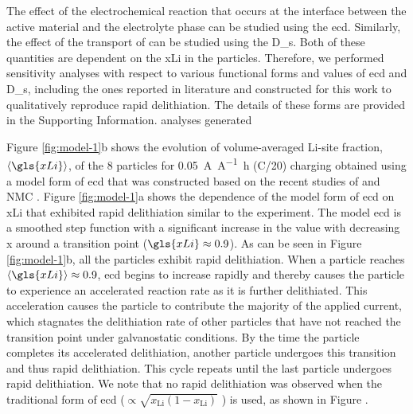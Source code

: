 \documentclass{article}
\begin{document}
The effect of the electrochemical reaction that occurs at the
interface between the active material and the electrolyte phase can be
studied using the \gls{ecd}. Similarly, the effect of the transport of
 can be studied using the \gls{D_s}. Both of these quantities
are dependent on the \gls{xLi} in the particles. Therefore, we
performed sensitivity analyses with respect to various functional
forms and values of \gls{ecd} and \gls{D_s}, including the ones
reported in literature and constructed for this work to
qualitatively reproduce rapid delithiation. The details of these forms
are provided in the Supporting Information. %
analyses generated

Figure \ref{fig:model-1}b shows the evolution of volume-averaged
Li-site fraction, $\left\langle \gls{xLi} \right\rangle$, of the 8
particles for \SI{0.05}{\ampere\per\ampere\hour} (C/20) charging
obtained using a model form of \gls{ecd} that was constructed based on
the recent studies of \nca{} \cite{chueh2021} and NMC \cite{tsai2018,
  mukherjee2017, chiang2020}. Figure \ref{fig:model-1}a shows the
dependence of the model form of \gls{ecd} on \gls{xLi} that exhibited
rapid delithiation similar to the experiment. The model \gls{ecd} is a
smoothed step function with a significant increase in the value with
decreasing x around a transition point ($\gls{xLi}\approx0.9$). As can
be seen in Figure \ref{fig:model-1}b, all the particles exhibit rapid
delithiation. When a particle reaches $\left\langle \gls{xLi}
\right\rangle\approx0.9$, \gls{ecd} begins to increase rapidly and
thereby causes the particle to experience an accelerated reaction rate
as it is further delithiated. This acceleration causes the particle to
contribute the majority of the applied current, which stagnates the
delithiation rate of other particles that have not reached the
transition point under galvanostatic conditions. By the time the
particle completes its accelerated delithiation, another particle
undergoes this transition and thus rapid delithiation. This cycle
repeats until the last particle undergoes rapid delithiation.  We note
that no rapid delithiation was observed when the traditional form of
\gls{ecd} ($\propto\sqrt{{x_{\textrm{Li}}}(1-{x_{\textrm{Li}}})}$
\cite{newman1993, newman1994, newman1995, newman1996}) is used, as
shown in Figure .
\end{document}
